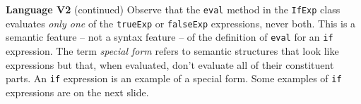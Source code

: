 \begin{minipage}[t]{\sw}
\slidenumber
\LARGE
{\bf Language V2} (continued)\exx
\Large
{}\exx
\LARGE
Observe that the \verb'eval' method in the \verb'IfExp' class
evaluates {\em only one}
of the \verb'trueExp' or \verb'falseExp' expressions, never both.
This is a semantic feature -- not a syntax feature --
of the definition of \verb'eval' for an \verb'if' expression.
The term {\em special form} refers
to semantic structures that look like expressions
but that, when evaluated, don't evaluate all of their constituent parts.
An \verb'if' expression is an example of a special form.\exx
Some examples of \verb'if' expressions are on the next slide.
\end{minipage}
\clearpage
